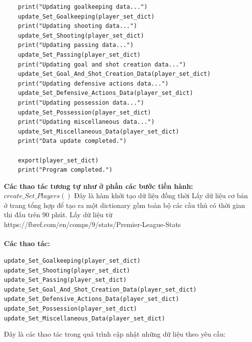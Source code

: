 \documentclass[12pt]{report}
\begin{document}
{\begin{lstlisting}
	print("Updating goalkeeping data...")
	update_Set_Goalkeeping(player_set_dict)
	print("Updating shooting data...")
	update_Set_Shooting(player_set_dict)
	print("Updating passing data...")
	update_Set_Passing(player_set_dict)
	print("Updating goal and shot creation data...")
	update_Set_Goal_And_Shot_Creation_Data(player_set_dict)
	print("Updating defensive actions data...")
	update_Set_Defensive_Actions_Data(player_set_dict)
	print("Updating possession data...")
	update_Set_Possession(player_set_dict)
	print("Updating miscellaneous data...")
	update_Set_Miscellaneous_Data(player_set_dict)
	print("Data update completed.")

	export(player_set_dict)
	print("Program completed.")
\end{lstlisting}
\textbf{Các thao tác tương tự như ở phần các bước tiến hành:}\\
\textbf{$create\_Set\_Players()$} Đây là hàm khởi tạo dữ liệu đồng thời Lấy dữ liệu cơ bản ở trang tổng hợp để tạo ra một dictionary gồm toàn bộ các cầu thủ có thời gian thi đấu trên 90 phút. Lấy dữ liệu từ https://fbref.com/en/comps/9/stats/Premier-League-Stats\\\\
\textbf{Các thao tác:}
\begin{flushleft}
\texttt{update\_Set\_Goalkeeping(player\_set\_dict)}\\
\texttt{update\_Set\_Shooting(player\_set\_dict)}\\
\texttt{update\_Set\_Passing(player\_set\_dict)}\\
\texttt{update\_Set\_Goal\_And\_Shot\_Creation\_Data(player\_set\_dict)}\\
\texttt{update\_Set\_Defensive\_Actions\_Data(player\_set\_dict)}\\
\texttt{update\_Set\_Possession(player\_set\_dict)}\\
\texttt{update\_Set\_Miscellaneous\_Data(player\_set\_dict)}\\
\end{flushleft}
Đây là các thao tác trong quá trình cập nhật những dữ liệu theo yêu cầu:

}
\end{document}
